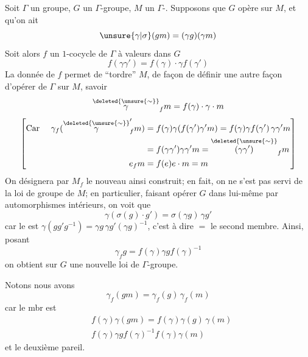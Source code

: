 Soit $\Gamma$ un groupe, $G$ un $\Gamma$-groupe, $M$ un $\Gamma$-. Supposons que $G$ opère sur $M$, et qu'on ait
\[
\unsure{\gamma|\sigma}(gm)=(\gamma g)(\gamma m)
\]
Soit alors $f$ un $1$-cocycle de $\Gamma$ à valeurs dans $G$
\[
f(\gamma\gamma')=f(\gamma)\cdot\gamma f(\gamma')
\]
La donnée de $f$ permet de ``tordre'' $M$, de façon  de définir une autre façon d'opérer de $\Gamma$ sur $M$, savoir
\[
\overset{\deleted{\unsure{\sim}}}{\gamma}_f m=f(\gamma)\cdot\gamma\cdot m
\]
\[
\left[\begin{aligned}
\text{Car }\quad\gamma_f(\overset{\deleted{\unsure{\sim}}}{\gamma}'_f m)&=f(\gamma)\gamma(f(\gamma')\gamma'm)=f(\gamma)\gamma f(\gamma')\,\gamma\gamma'm\\
&=f(\gamma\gamma')\gamma\gamma'm=\overset{\deleted{\unsure{\sim}}}{(\gamma\gamma')}_f m\\
e_f m&=f(e)e\cdot m=m
\end{aligned}\right]
\]
On désignera par $M_f$ le nouveau  ainsi construit; en fait, on ne s'est pas servi de la loi de groupe de $M$; en particulier, faisant opérer $G$ dans lui-même par automorphismes intérieurs, on  voit que
\[
\gamma(\sigma(g)\cdot g')=\sigma(\gamma g)\,\gamma g'
\]
car le   est $\gamma(gg'g^{-1})=\gamma g\,\gamma g'(\gamma g)^{-1}$, c'est à dire $=$ le second membre. Ainsi, posant
\[
\gamma_f g=f(\gamma)\gamma g f(\gamma)^{-1}
\]
on obtient sur $G$ une nouvelle loi de $\Gamma$-groupe.

Notons   nous avons
\[
\gamma_f(gm)=\gamma_f(g)\,\gamma_f(m)
\]
car le  mbr est
\[
\begin{aligned}
&f(\gamma)\gamma(gm)=f(\gamma)\gamma(g)\,\gamma(m)\\
&f(\gamma)\gamma g f(\gamma)^{-1}f(\gamma)\gamma(m)
\end{aligned}
\]
et le deuxième  pareil.
